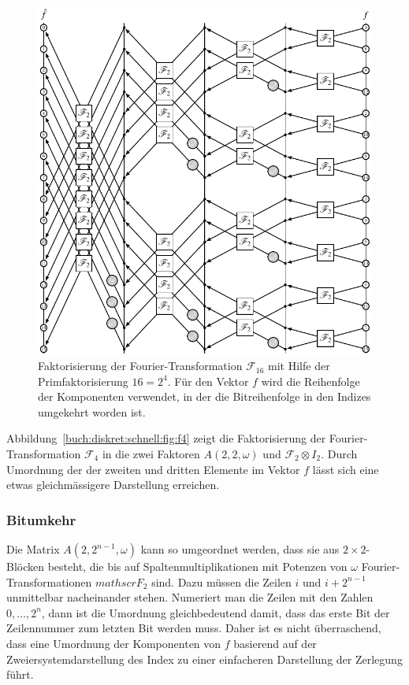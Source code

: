 \begin{figure}
\centering
\includegraphics{chapters/060-diskret/images/f16.pdf}
\caption{Faktorisierung der Fourier-Transformation $\mathscr{F}_{16}$
mit Hilfe der Primfaktorisierung $16=2^4$.
Für den Vektor $f$ wird die Reihenfolge der Komponenten verwendet,
in der die Bitreihenfolge in den Indizes umgekehrt worden ist.
\label{buch:diskret:schnell:fig:f16}}
\end{figure}%

Abbildung~\ref{buch:diskret:schnell:fig:f4} zeigt die Faktorisierung
der Fourier-Transformation $\mathscr{F}_4$ in die zwei Faktoren
$A(2,2,\omega)$ und $\mathscr{F}_2\otimes I_2$.
Durch Umordnung der der zweiten und dritten Elemente im Vektor $f$
lässt sich eine etwas gleichmässigere Darstellung erreichen.

%
%
\subsubsection{Bitumkehr}
Die Matrix $A(2,2^{n-1},\omega)$ kann so umgeordnet werden, dass 
sie aus $2\times 2$-Blöcken besteht, die bis auf Spaltenmultiplikationen
mit Potenzen von $\omega$ Fourier-Transformationen $mathscr{F}_2$ sind.
Dazu müssen die Zeilen $i$ und $i+2^{n-1}$ unmittelbar nacheinander
stehen.
Numeriert man die Zeilen mit den Zahlen $0,\dots,2^n$, dann ist die
Umordnung gleichbedeutend damit, dass das erste Bit der Zeilennummer
zum letzten Bit werden muss.
Daher ist es nicht überraschend, dass eine Umordnung der Komponenten
von $f$ basierend auf der Zweiersystemdarstellung des Index zu einer
einfacheren Darstellung der Zerlegung führt.


